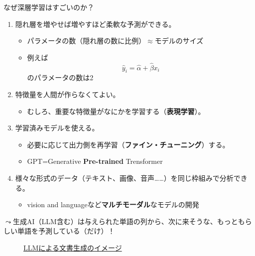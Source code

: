 \documentclass[
  xelatex,
  ja=standard]{bxjsarticle}
\providecommand{\tightlist}{%
  \setlength{\itemsep}{0pt}\setlength{\parskip}{0pt}}\usepackage{longtable,booktabs,array}
\begin{document}
なぜ深層学習はすごいのか？

\begin{enumerate}
\def\labelenumi{\arabic{enumi}.}
\tightlist
\item
  隠れ層を増やせば増やすほど柔軟な予測ができる。

  \begin{itemize}
  \tightlist
  \item
    パラメータの数（隠れ層の数に比例）\(\approx\)モデルのサイズ
  \item
    例えば\[\hat{y}_i = \hat{\alpha} + \hat{\beta} x_i\]のパラメータの数は2
  \end{itemize}
\item
  特徴量を人間が作らなくてよい。

  \begin{itemize}
  \tightlist
  \item
    むしろ、重要な特徴量がなにかを学習する（\textbf{表現学習}）。
  \end{itemize}
\item
  学習済みモデルを使える。

  \begin{itemize}
  \tightlist
  \item
    必要に応じて出力側を再学習（\textbf{ファイン・チューニング}）する。
  \item
    GPT=Generative \textbf{Pre-trained} Trensformer
  \end{itemize}
\item
  様々な形式のデータ（テキスト、画像、音声\ldots\ldots）を同じ枠組みで分析できる。

  \begin{itemize}
  \tightlist
  \item
    vision and languageなど\textbf{マルチモーダル}なモデルの開発
  \end{itemize}
\end{enumerate}

\(\leadsto\)生成AI（LLM含む）は与えられた単語の列から、次に来そうな、もっともらしい単語を予測している（だけ）！

\begin{figure}[htpb]

{\centering 

}

\caption{\href{https://huggingface.co/learn/nlp-course/ja/chapter1/4?fw=pt}{LLMによる文書生成のイメージ}}

\end{figure}
\end{document}
